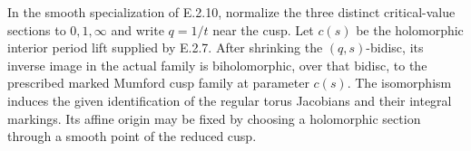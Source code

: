 \begin{proposition}
In the smooth specialization of E.2.10, normalize
the three distinct critical-value sections to
$0,1,\infty$ and write $q=1/t$ near the cusp.
Let $c(s)$ be the holomorphic interior period
lift supplied by E.2.7.  After shrinking the
$(q,s)$-bidisc, its inverse image in the actual
family is biholomorphic, over that bidisc, to
the prescribed marked Mumford cusp family at
parameter $c(s)$.  The isomorphism induces
the given identification of the regular
torus Jacobians and their integral markings.
Its affine origin may be fixed by choosing
a holomorphic section through a smooth
point of the reduced cusp.
\end{proposition}
